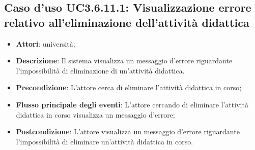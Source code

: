\subsection{Caso d'uso \texorpdfstring{UC3.6.11.1}{UC3.6.11.1}: Visualizzazione errore relativo all’eliminazione dell’attività didattica}
\begin{itemize}
\item \textbf{Attori}: università;
\item \textbf{Descrizione}: Il sistema visualizza un messaggio d'errore riguardante l'impossibilità di eliminazione di un'attività didattica.

\item \textbf{Precondizione}: L'attore cerca di eliminare l'attività didattica in corso;

\item \textbf{Flusso principale degli eventi}: L'attore cercando di eliminare l'attività didattica in corso visualizza un messaggio d'errore;

\item \textbf{Postcondizione}: L'attore visualizza un messaggio d'errore riguardante l'impossibilità di eliminare un'attività didattica in corso.

\end{itemize}
